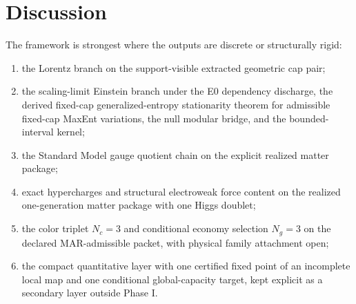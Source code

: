 \documentclass[11pt]{article}
\begin{document}
\section{Discussion}

The framework is strongest where the outputs are discrete or structurally rigid:
\begin{enumerate}[leftmargin=2em]
\item the Lorentz branch on the support-visible extracted geometric cap pair;
\item the scaling-limit Einstein branch under the E0 dependency discharge, the derived fixed-cap generalized-entropy stationarity theorem for admissible fixed-cap MaxEnt variations, the null modular bridge, and the bounded-interval kernel;
\item the Standard Model gauge quotient chain on the explicit realized matter package;
\item exact hypercharges and structural electroweak force content on the realized one-generation matter package with one Higgs doublet;
\item the color triplet \(N_c=3\) and conditional economy selection \(N_g=3\) on the declared MAR-admissible packet, with physical family attachment open;
\item the compact quantitative layer with one certified fixed point of an incomplete local map and
one conditional global-capacity target, kept explicit as a secondary layer outside Phase I.
\end{enumerate}
\end{document}

